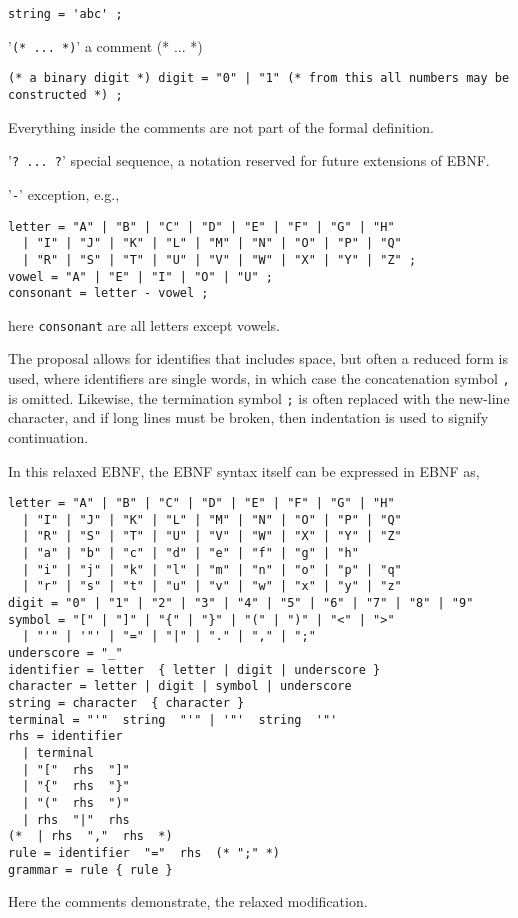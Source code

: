 \begin{description}
  \begin{lstlisting}[language=EBNF]
string = 'abc' ;
  \end{lstlisting}
\item '\verb|(* ... *)|' a comment (* ... *) 
  \begin{lstlisting}[language=EBNF]
(* a binary digit *) digit = "0" | "1" (* from this all numbers may be constructed *) ;
  \end{lstlisting}
  Everything inside the comments are not part of the formal definition.
\item '\verb|? ... ?|' special sequence, a notation reserved for future extensions of EBNF.
\item '\verb|-|' exception, e.g.,
  \begin{lstlisting}[language=EBNF]
letter = "A" | "B" | "C" | "D" | "E" | "F" | "G" | "H" 
  | "I" | "J" | "K" | "L" | "M" | "N" | "O" | "P" | "Q" 
  | "R" | "S" | "T" | "U" | "V" | "W" | "X" | "Y" | "Z" ;
vowel = "A" | "E" | "I" | "O" | "U" ; 
consonant = letter - vowel ;
  \end{lstlisting}
  here \verb|consonant| are all letters except vowels.
\end{description}
The proposal allows for identifies that includes space, but often a reduced form is used, where identifiers are single words, in which case the concatenation symbol \verb|,| is omitted. Likewise, the termination symbol \verb|;| is often replaced with the new-line character, and if long lines must be broken, then indentation is used to signify continuation.

In this relaxed EBNF, the EBNF syntax itself can be expressed in EBNF as,
\begin{lstlisting}[language=EBNF]
letter = "A" | "B" | "C" | "D" | "E" | "F" | "G" | "H" 
  | "I" | "J" | "K" | "L" | "M" | "N" | "O" | "P" | "Q" 
  | "R" | "S" | "T" | "U" | "V" | "W" | "X" | "Y" | "Z"
  | "a" | "b" | "c" | "d" | "e" | "f" | "g" | "h" 
  | "i" | "j" | "k" | "l" | "m" | "n" | "o" | "p" | "q" 
  | "r" | "s" | "t" | "u" | "v" | "w" | "x" | "y" | "z" 
digit = "0" | "1" | "2" | "3" | "4" | "5" | "6" | "7" | "8" | "9" 
symbol = "[" | "]" | "{" | "}" | "(" | ")" | "<" | ">"
  | "'" | '"' | "=" | "|" | "." | "," | ";" 
underscore = "_" 
identifier = letter  { letter | digit | underscore } 
character = letter | digit | symbol | underscore 
string = character  { character } 
terminal = "'"  string  "'" | '"'  string  '"' 
rhs = identifier
  | terminal
  | "["  rhs  "]"
  | "{"  rhs  "}"
  | "("  rhs  ")"
  | rhs  "|"  rhs
(*  | rhs  ","  rhs  *)
rule = identifier  "="  rhs  (* ";" *)
grammar = rule { rule } 
\end{lstlisting}
Here the comments demonstrate, the relaxed modification.

